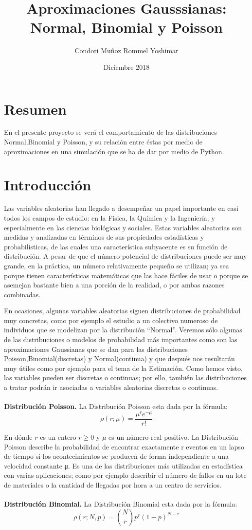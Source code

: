 \documentclass[12pt,a4paper]{article}
\title{Aproximaciones Gausssianas:\\Normal, Binomial y Poisson}
\author{Condori Muñoz Rommel Yoshimar}
\date{Diciembre 2018}
\begin{document}
\maketitle
\begin{multicols}{2}
\section{Resumen}
    En el presente proyecto se verá el comportamiento de las distribuciones Normal,Binomial y Poisson, y su relación entre éstas por medio de aproximaciones en una simulación  que se ha de dar por medio de Python.
\section{Introducción}
    Las variables aleatorias han llegado a desempeñar un papel importante en casi todos los campos de estudio: en la Física, la Química y la Ingeniería; y especialmente en las ciencias biológicas y sociales. Estas variables aleatorias son medidas y analizadas en términos de sus propiedades estadísticas y probabilísticas, de las cuales una característica subyacente es su función de distribución. A pesar de que el número potencial de distribuciones puede ser muy grande, en la práctica, un número relativamente pequeño se utilizan; ya sea porque tienen características matemáticas que las hace fáciles de usar o porque se asemejan bastante bien a una porción de la realidad, o por ambas razones combinadas.
    
    En ocasiones, algunas variables aleatorias siguen distribuciones de probabilidad muy concretas, como por ejemplo el estudio a un colectivo numeroso de individuos que se modelizan por la distribución “Normal”. Veremos sólo algunas de las distribuciones o modelos de probabilidad más importantes como son las aproximaciones Gaussianas que se dan para las distribuciones Poisson,Binomial(discretas) y Normal(continua)   y que después nos resultarán muy útiles como por ejemplo para el tema de la Estimación.
    Como hemos visto, las variables pueden ser discretas o continuas; por ello, también las distribuciones a tratar podrán ir asociadas a variables aleatorias discretas o continuas.\\
    \\ \textbf{Distribución Poisson.} La Distribución Poisson esta dada por la fórmula:
    $$\rho(r;\mu)=\frac{\mu^re^{-\mu}}{r!}$$
    
    En dónde $r$ es un entero $r\geq0$ y $\mu$ es un número real positivo. La Distribución Poisson describe la probabilidad de encontrar exactamente r eventos en un lapso de tiempo si los acontecimientos se producen de forma independiente a una velocidad constante μ. Es una de las distribuciones más utilizadas en estadística con varias aplicaciones; como por ejemplo describir el número de fallos en un lote de materiales o la cantidad de llegadas por hora a un centro de servicios.\\\\
    \textbf{Distribución Binomial.} La Distribución Binomial esta dada por la fórmula: 
    $$\rho(r;N,p)={N \choose r}p^r(1-p)^{N-r}$$
    

\end{multicols}
\end{document}
